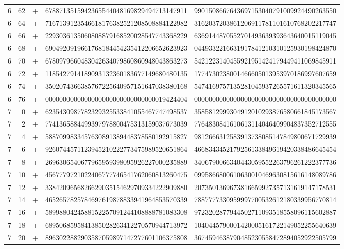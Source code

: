 \begin{longtable}{rrrll}
6 & 62 & + & 6788713515942365544048169829494713147911 & 9901508667643697153040791009924490263550 \\
6 & 64 & + & 7167139123546618176382521208508884122982 & 3162037203861206911781101610768202217747 \\
6 & 66 & + & 2293036135060808879168520028547743368229 & 6369144870552701493639393643640015119045 \\
6 & 68 & + & 6904920919661768184454235412206652623923 & 0449332216631917841210310125930198424870 \\
6 & 70 & + & 6780979660483042634079860860948043863273 & 5421223140455921951424179449411069845911 \\
6 & 72 & + & 1185427914189093132360183677149680480135 & 1774730238001466605013953970186997607659 \\
6 & 74 & + & 3502074366385767225640957151647038380168 & 5474169757135281045937265571611320345565 \\
6 & 76 & + & 0000000000000000000000000000000019424404 & 0000000000000000000000000000000000000000 \\
7 & 0 & + & 6235430987782329325533841055467747498537 & 3585812999304912010293876580661845173567 \\
7 & 2 & + & 7741365884499397978800475313159037673039 & 7764830841610613114046409904837352712555 \\
7 & 4 & + & 5887099833457630891389448378580192915827 & 9812666312583913738085147849800671729939 \\
7 & 6 & + & 9260744571123945210222773475989520651864 & 4668343452179256133849619420338486645454 \\
7 & 8 & + & 2696306540677965959398095926227000235889 & 3406790066340443059552263796261222377736 \\
7 & 10 & + & 4567779721022406777746541762060813260475 & 0995866800610630010469630815616148089786 \\
7 & 12 & + & 3384209656826629035154629709334222909880 & 2073501369673816659927357131619147178531 \\
7 & 14 & + & 4652657825784697619878833941964853570339 & 7887777330959997700532612180339956770814 \\
7 & 16 & + & 5899880424588152257091244108888781083308 & 9723202877944502711093518558096115602887 \\
7 & 18 & + & 6895068595841385028263412270570944713972 & 1040445790001420005161722149052255640639 \\
7 & 20 & + & 8963022882903587059897147277601106375808 & 3674594638790485230558472894052922505799 \\

\end{longtable}
